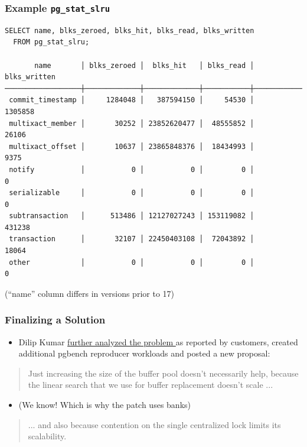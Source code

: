 \begin{frame}[fragile]
  \frametitle{Example \texttt{pg\_stat\_slru}}

  \linksize
\begin{verbatim}
SELECT name, blks_zeroed, blks_hit, blks_read, blks_written
  FROM pg_stat_slru;

       name       │ blks_zeroed │  blks_hit   │ blks_read │ blks_written 
──────────────────┼─────────────┼─────────────┼───────────┼──────────────
 commit_timestamp │     1284048 │   387594150 │     54530 │      1305858
 multixact_member │       30252 │ 23852620477 │  48555852 │        26106
 multixact_offset │       10637 │ 23865848376 │  18434993 │         9375
 notify           │           0 │           0 │         0 │            0
 serializable     │           0 │           0 │         0 │            0
 subtransaction   │      513486 │ 12127027243 │ 153119082 │       431238
 transaction      │       32107 │ 22450403108 │  72043892 │        18064
 other            │           0 │           0 │         0 │            0
\end{verbatim}
  \linksize (``name'' column differs in versions prior to 17)

\end{frame}

\begin{frame}
  \frametitle{Finalizing a Solution}
  \begin{itemize}
    \item Dilip Kumar
      \href{https://postgr.es/m/CAFiTN-vzDvNz=ExGXz6gdyjtzGixKSqs0mKHMmaQ8sOSEFZ33A@mail.gmail.com}
      {further analyzed the problem \faExternalLink} as reported by customers, created
      additional pgbench reproducer workloads and posted a new proposal:
  \end{itemize}
  \begin{quote}
    \linksize Just increasing the size of the buffer pool doesn't necessarily help,
    because the linear search that we use for buffer replacement doesn't scale ...
  \end{quote}
  \begin{itemize}
    \item (We know!  Which is why the patch uses banks)
  \end{itemize}
  \begin{quote}
    \linksize
    ... and also because contention on the single centralized lock
    limits its scalability.
  \end{quote}
\end{frame}

